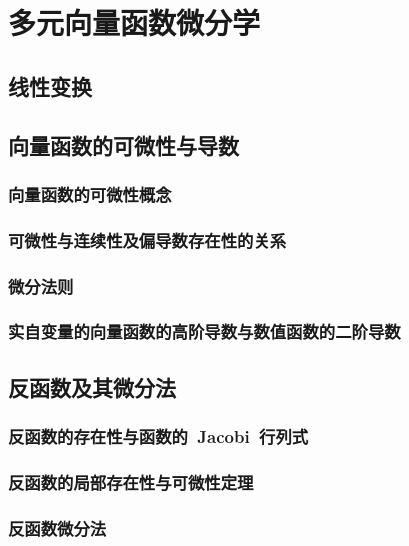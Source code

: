

\chapter{多元向量函数微分学}\label{ch:17}
\section{线性变换}
\begin{exercise}

\end{exercise}
\section{向量函数的可微性与导数}
\subsection{向量函数的可微性概念}
\subsection{可微性与连续性及偏导数存在性的关系}
\subsection{微分法则}
\subsection{实自变量的向量函数的高阶导数与数值函数的二阶导数}
\begin{exercise}

\end{exercise}
\section{反函数及其微分法}
\subsection{反函数的存在性与函数的~Jacobi~行列式}
\subsection{反函数的局部存在性与可微性定理}
\subsection{反函数微分法}
\begin{exercise}

\end{exercise}
